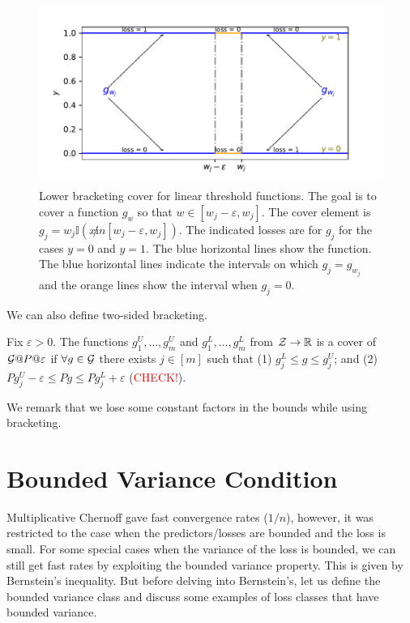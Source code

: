 \documentclass[twoside]{article}
\newcommand{\I}{\mathbb{I}}
\begin{document}
\begin{figure}
    \centering
    \includegraphics[width=12cm, height=6cm]{figures/loss.pdf}
     \caption{Lower bracketing cover for linear threshold functions. The goal is to cover a function $g_w$ so that $w \in [w_j-\varepsilon, w_j]$. The cover element is $g_j = w_j \I(x \not in [w_j-\varepsilon, w_j])$. The indicated losses are for $g_j$ for the cases $y=0$ and $y=1$. The blue horizontal lines show the function. The blue horizontal lines indicate the intervals on which $g_j = g_{w_j}$ and the orange lines show the interval when $g_j = 0$.}
    \label{fig:lb}
\end{figure}

We can also define two-sided bracketing.
\begin{definition}[Bracketing]
    Fix $\varepsilon > 0$. The functions $g_1^U, \dots, g_m^U$ and $g_1^L, \dots, g_m^L$ from $\mathcal{Z} \to \mathbb{R}$ is a cover of $\mathcal{G} @ P @ \varepsilon$ if $\forall g \in \mathcal{G}$ there exists $j \in [m]$ such that (1) $g_j^L \le g \le g_j^U$; and (2) $Pg_j^U - \varepsilon \le Pg \le Pg_j^L + \varepsilon$ (\textcolor{red}{CHECK!}).
\end{definition}
We remark that we lose some constant factors in the bounds while using bracketing.

\section{Bounded Variance Condition}
Multiplicative Chernoff gave fast convergence rates ($1/n$), however, it was restricted to the case when the predictors/losses are bounded and the loss is small. For some special cases when the variance of the loss is bounded, we can still get fast rates by exploiting the bounded variance property. This is given by Bernstein's inequality. But before delving into Bernstein's, let us define the bounded variance class and discuss some examples of loss classes that have bounded variance.   
\end{document}
